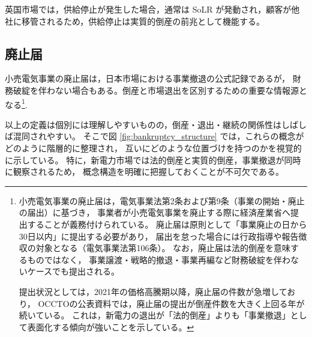 英国市場では，供給停止が発生した場合，通常は SoLR が発動され，顧客が他社に移管されるため，供給停止は実質的倒産の前兆として機能する。

\subsection{廃止届}

小売電気事業の廃止届は，日本市場における事業撤退の公式記録であるが，
財務破綻を伴わない場合もある。倒産と市場退出を区別するための重要な情報源となる\footnote{
小売電気事業の廃止届は，電気事業法第2条および第9条（事業の開始・廃止の届出）に基づき，
事業者が小売電気事業を廃止する際に経済産業省へ提出することが義務付けられている。
廃止届は原則として「事業廃止の日から30日以内」に提出する必要があり，
届出を怠った場合には行政指導や報告徴収の対象となる（電気事業法第106条）。
なお，廃止届は法的倒産を意味するものではなく，
事業譲渡・戦略的撤退・事業再編など財務破綻を伴わないケースでも提出される。

提出状況としては，2021年の価格高騰期以降，廃止届の件数が急増しており，
OCCTOの公表資料では，廃止届の提出が倒産件数を大きく上回る年が続いている。
これは，新電力の退出が「法的倒産」よりも「事業撤退」として表面化する傾向が強いことを示している。
}.

\vspace{1\baselineskip}

以上の定義は個別には理解しやすいものの，倒産・退出・継続の関係性はしばしば混同されやすい。
そこで図 \ref{fig:bankruptcy_structure} では，これらの概念がどのように階層的に整理され，
互いにどのような位置づけを持つのかを視覚的に示している。
特に，新電力市場では法的倒産と実質的倒産，事業撤退が同時に観察されるため，
概念構造を明確に把握しておくことが不可欠である。


